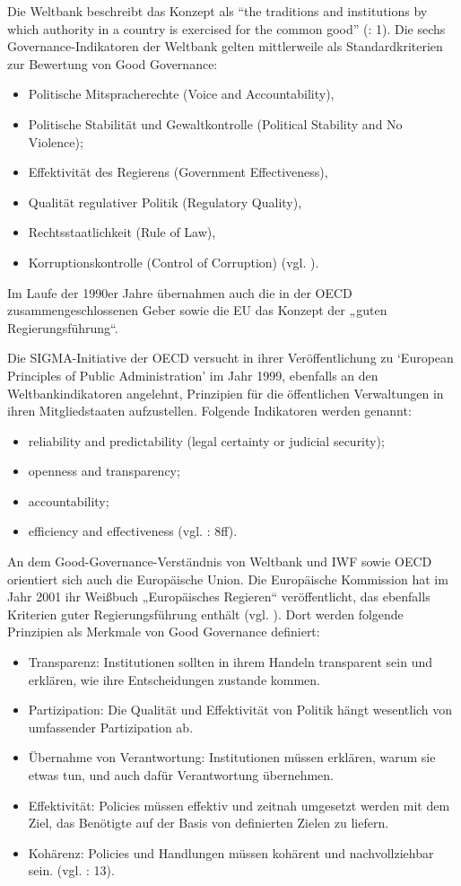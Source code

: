 Die Weltbank beschreibt das Konzept als “the traditions and institutions by which authority in a country is exercised for the common good” (\cite{weltbank}: 1). Die sechs Governance-Indikatoren der Weltbank gelten mittlerweile als Standardkriterien zur Bewertung von Good Governance: 
\begin{itemize}
\item Politische Mitspracherechte (Voice and Accountability),
\item Politische Stabilität und Gewaltkontrolle (Political Stability and No Violence);
\item Effektivität des Regierens (Government Effectiveness),
\item Qualität regulativer Politik (Regulatory Quality),
\item Rechtsstaatlichkeit (Rule of Law),
\item Korruptionskontrolle (Control of Corruption) (vgl. \cite{kaufmann}).
\end{itemize}
Im Laufe der 1990er Jahre übernahmen auch die in der OECD zusammengeschlossenen Geber sowie die EU das Konzept der „guten Regierungsführung“.\par
Die SIGMA-Initiative der OECD versucht in ihrer Veröffentlichung zu ‘European Principles of Public Administration’ im Jahr 1999, ebenfalls an den Weltbankindikatoren angelehnt, Prinzipien für die öffentlichen Verwaltungen in ihren Mitgliedstaaten aufzustellen. Folgende Indikatoren werden genannt: 
\begin{itemize}
\item reliability and predictability (legal certainty or judicial security); 
\item openness and transparency; 
\item accountability; 
\item efficiency and effectiveness (vgl. \cite{oecd99}: 8ff).
\end{itemize}
An dem Good-Governance-Verständnis von Weltbank und IWF sowie OECD orientiert sich auch die Europäische Union. Die Europäische Kommission hat im Jahr 2001 ihr Weißbuch „Europäisches Regieren“ veröffentlicht, das ebenfalls Kriterien guter Regierungsführung enthält (vgl. \cite{czada2010}). Dort werden folgende Prinzipien als Merkmale von Good Governance definiert:
\begin{itemize}
\item Transparenz: Institutionen sollten in ihrem Handeln transparent sein und erklären, wie ihre Entscheidungen zustande kommen.
\item Partizipation: Die Qualität und Effektivität von Politik hängt wesentlich von umfassender Partizipation ab.
\item Übernahme von Verantwortung: Institutionen müssen erklären, warum sie etwas tun, und auch dafür Verantwortung übernehmen.
\item Effektivität: Policies müssen effektiv und zeitnah umgesetzt werden mit dem Ziel, das Benötigte auf der Basis von definierten Zielen zu liefern.
\item Kohärenz: Policies und Handlungen müssen kohärent und nachvollziehbar sein.
(vgl. \cite{euko01}: 13).
\end{itemize}
